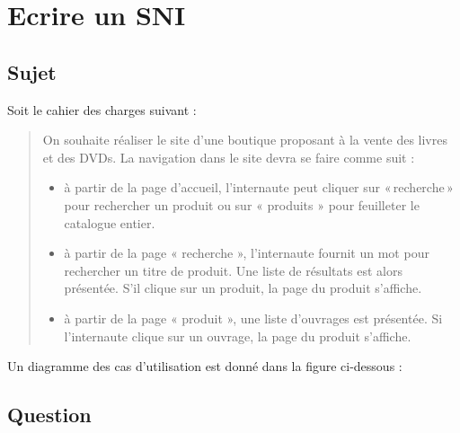 \documentclass[12pt]{article}
\begin{document}
\section{Ecrire un SNI}

\subsection*{Sujet}

Soit le cahier des charges suivant :

\begin{quote}
On souhaite réaliser le site d'une boutique proposant à la vente des livres et des DVDs. La navigation dans le site devra se faire comme suit :
\begin{itemize}
\item à partir de la page d'accueil, l'internaute peut cliquer sur «\,recherche\,» pour rechercher un produit ou sur
« produits » pour feuilleter le catalogue entier.
\item à partir de la page « recherche », l'internaute fournit un mot pour rechercher un titre de produit. Une liste de résultats est alors présentée.
S'il clique sur un produit, la page du produit s'affiche.
\item à partir de la page « produit », une liste d'ouvrages est présentée. Si l'internaute clique sur un ouvrage, la page du produit s'affiche.
\end{itemize}
\end{quote}

Un diagramme des cas d'utilisation est donné dans la figure ci-dessous :


\subsection*{Question}
\end{document}
